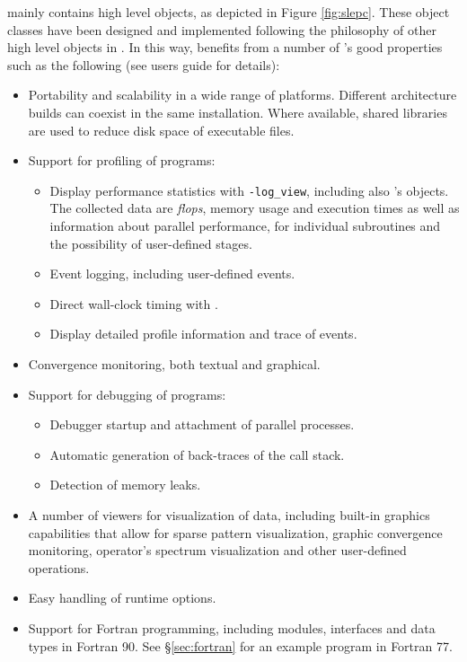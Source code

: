 	\slepc mainly contains high level objects, as depicted in Figure \ref{fig:slepc}. These object classes have been designed and implemented following the philosophy of other high level objects in \petsc. In this way, \slepc benefits from a number of \petsc's good properties such as the following (see \petsc{} users guide for details):
\begin{itemize}
\item Portability and scalability in a wide range of platforms. Different architecture builds can coexist in the same installation. Where available, shared libraries are used to reduce disk space of executable files.
\item Support for profiling of programs:
  \begin{itemize}
  \setlength{\itemsep}{0mm}
  \item Display performance statistics with \Verb!-log_view!, including also \slepc's objects. The collected data are \emph{flops}, memory usage and execution times as well as information about parallel performance, for individual subroutines and the possibility of user-defined stages.
  \item Event logging, including user-defined events.
  \item Direct wall-clock timing with .
  \item Display detailed profile information and trace of events.
  \end{itemize}
\item Convergence monitoring, both textual and graphical.
\item Support for debugging of programs:
  \begin{itemize}
  \setlength{\itemsep}{0mm}
  \item Debugger startup and attachment of parallel processes.
  \item Automatic generation of back-traces of the call stack.
  \item Detection of memory leaks.
  \end{itemize}
\item A number of viewers for visualization of data, including built-in graphics capabilities that allow for sparse pattern visualization, graphic convergence monitoring, operator's spectrum visualization and other user-defined operations.
\item Easy handling of runtime options.
\item Support for Fortran programming, including modules, interfaces and data types in Fortran 90. See \S\ref{sec:fortran} for an example program in Fortran 77.
\end{itemize}

